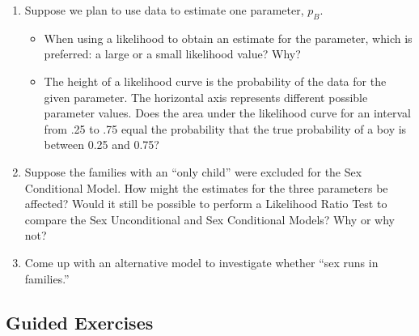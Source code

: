 \documentclass[
]{krantz}
\providecommand{\tightlist}{%
  \setlength{\itemsep}{0pt}\setlength{\parskip}{0pt}}
\begin{document}
\begin{enumerate}
\def\labelenumi{\arabic{enumi}.}
\tightlist
\item
  Suppose we plan to use data to estimate one parameter, \(p_B\).

  \begin{itemize}
  \tightlist
  \item
    When using a likelihood to obtain an estimate for the parameter, which is preferred: a large or a small likelihood value? Why?
  \item
    The height of a likelihood curve is the probability of the data for the given parameter. The horizontal axis represents different
    possible parameter values. Does the area under the likelihood curve for an interval from .25 to .75 equal the probability that the
    true probability of a boy is between 0.25 and 0.75?
  \end{itemize}
\item
  Suppose the families with an ``only child'' were excluded for the Sex Conditional Model. How might the estimates for the three parameters be affected? Would it still be possible to perform a Likelihood Ratio Test to compare the Sex Unconditional and Sex Conditional Models? Why or why not?
\item
  Come up with an alternative model to investigate whether ``sex runs in families.''
\end{enumerate}

\subsection{Guided Exercises}\label{guided-exercises-1}
\end{document}
